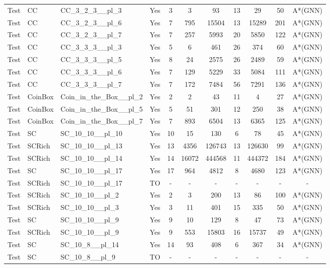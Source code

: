\documentclass{article}
\begin{document}
\begin{tabular}{lllcccccccc}
Test & CC & CC\_3\_2\_3\_\_pl\_3 & Yes & 3 & 3 & 93 & 13 & 29 & 50 & A*(GNN) \\
Test & CC & CC\_3\_2\_3\_\_pl\_6 & Yes & 7 & 795 & 15504 & 13 & 15289 & 201 & A*(GNN) \\
Test & CC & CC\_3\_2\_3\_\_pl\_7 & Yes & 7 & 257 & 5993 & 20 & 5850 & 122 & A*(GNN) \\
Test & CC & CC\_3\_3\_3\_\_pl\_3 & Yes & 5 & 6 & 461 & 26 & 374 & 60 & A*(GNN) \\
Test & CC & CC\_3\_3\_3\_\_pl\_5 & Yes & 8 & 24 & 2575 & 26 & 2489 & 59 & A*(GNN) \\
Test & CC & CC\_3\_3\_3\_\_pl\_6 & Yes & 7 & 129 & 5229 & 33 & 5084 & 111 & A*(GNN) \\
Test & CC & CC\_3\_3\_3\_\_pl\_7 & Yes & 7 & 172 & 7484 & 56 & 7291 & 136 & A*(GNN) \\
Test & CoinBox & Coin\_in\_the\_Box\_\_pl\_2 & Yes & 2 & 2 & 43 & 11 & 4 & 27 & A*(GNN) \\
Test & CoinBox & Coin\_in\_the\_Box\_\_pl\_5 & Yes & 5 & 51 & 301 & 12 & 250 & 38 & A*(GNN) \\
Test & CoinBox & Coin\_in\_the\_Box\_\_pl\_7 & Yes & 7 & 893 & 6504 & 13 & 6365 & 125 & A*(GNN) \\
Test & SC & SC\_10\_10\_\_pl\_10 & Yes & 10 & 15 & 130 & 6 & 78 & 45 & A*(GNN) \\
Test & SCRich & SC\_10\_10\_\_pl\_13 & Yes & 13 & 4356 & 126743 & 13 & 126630 & 99 & A*(GNN) \\
Test & SCRich & SC\_10\_10\_\_pl\_14 & Yes & 14 & 16072 & 444568 & 11 & 444372 & 184 & A*(GNN) \\
Test & SC & SC\_10\_10\_\_pl\_17 & Yes & 17 & 964 & 4812 & 8 & 4680 & 123 & A*(GNN) \\
Test & SCRich & SC\_10\_10\_\_pl\_17 & TO & - & - & - & - & - & - & - \\
Test & SCRich & SC\_10\_10\_\_pl\_2 & Yes & 2 & 3 & 200 & 13 & 86 & 100 & A*(GNN) \\
Test & SCRich & SC\_10\_10\_\_pl\_3 & Yes & 3 & 11 & 401 & 15 & 335 & 50 & A*(GNN) \\
Test & SC & SC\_10\_10\_\_pl\_9 & Yes & 9 & 10 & 129 & 8 & 47 & 73 & A*(GNN) \\
Test & SCRich & SC\_10\_10\_\_pl\_9 & Yes & 9 & 553 & 15803 & 16 & 15737 & 49 & A*(GNN) \\
Test & SC & SC\_10\_8\_\_pl\_14 & Yes & 14 & 93 & 408 & 6 & 367 & 34 & A*(GNN) \\
Test & SC & SC\_10\_8\_\_pl\_9 & TO & - & - & - & - & - & - & - \\

\end{tabular}
\end{document}

